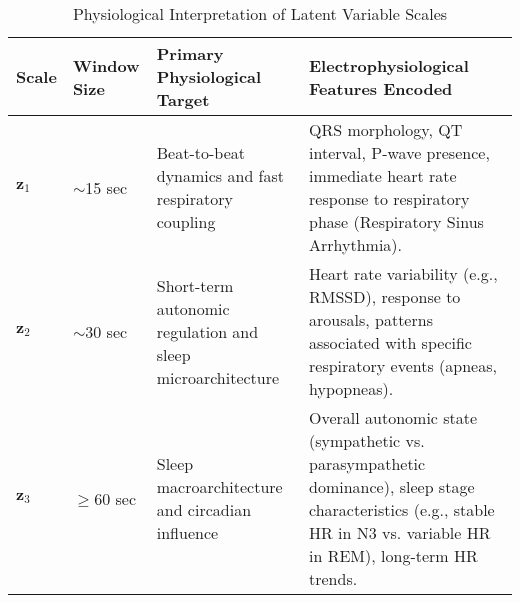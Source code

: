\documentclass[11pt,en]{elegantpaper}
\begin{document}
\begin{table}[H]
    \centering
    \caption{Physiological Interpretation of Latent Variable Scales}
    \label{tab:latent_interpretation}
    \begin{tabular}{p{} p{} p{} p{}}
        \toprule
        \textbf{Scale} & \textbf{Window Size} & \textbf{Primary Physiological Target} & \textbf{Electrophysiological Features Encoded} \\
        \midrule
        $\mathbf{z}_1$ & $\sim$15 sec & Beat-to-beat dynamics and fast respiratory coupling & QRS morphology, QT interval, P-wave presence, immediate heart rate response to respiratory phase (Respiratory Sinus Arrhythmia). \\
        \midrule
        $\mathbf{z}_2$ & $\sim$30 sec & Short-term autonomic regulation and sleep microarchitecture & Heart rate variability (e.g., RMSSD), response to arousals, patterns associated with specific respiratory events (apneas, hypopneas). \\
        \midrule
        $\mathbf{z}_3$ & $\geq$60 sec & Sleep macroarchitecture and circadian influence & Overall autonomic state (sympathetic vs. parasympathetic dominance), sleep stage characteristics (e.g., stable HR in N3 vs. variable HR in REM), long-term HR trends. \\
        \bottomrule
    \end{tabular}
\end{table}
\end{document}
